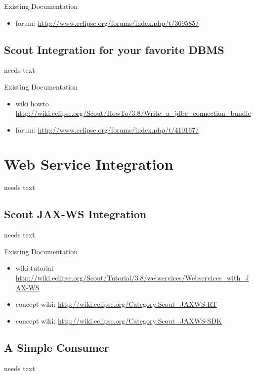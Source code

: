 \documentclass[a4paper,10pt,twoside]{book}
\begin{document}
\noindent Existing Documentation
\begin{itemize}
  \item forum: \url{http://www.eclipse.org/forums/index.php/t/369585/}
\end{itemize}

\section{Scout Integration for your favorite DBMS}
needs text

\noindent Existing Documentation
\begin{itemize}
  \item wiki howto \url{http://wiki.eclipse.org/Scout/HowTo/3.8/Write_a_jdbc_connection_bundle}
  \item forum: \url{http://www.eclipse.org/forums/index.php/t/410167/}
\end{itemize}

\chapter{Web Service Integration}
needs text

\section{Scout JAX-WS Integration}
needs text

\noindent Existing Documentation
\begin{itemize}
  \item wiki tutorial \url{http://wiki.eclipse.org/Scout/Tutorial/3.8/webservices/Webservices_with_JAX-WS}
  \item concept wiki: \url{http://wiki.eclipse.org/Category:Scout_JAXWS-RT}
  \item concept wiki: \url{http://wiki.eclipse.org/Category:Scout_JAXWS-SDK}
\end{itemize}

\section{A Simple Consumer}
needs text
\end{document}
